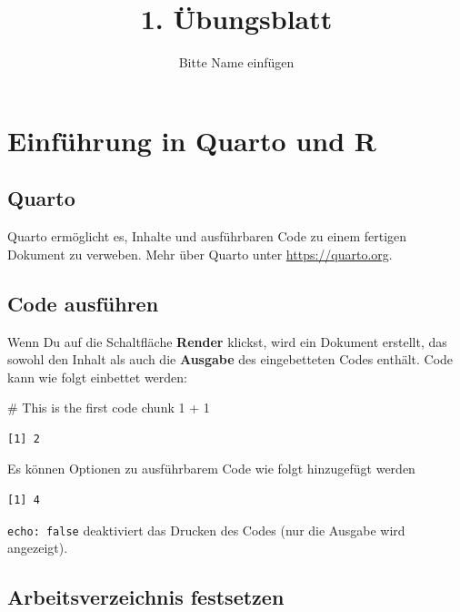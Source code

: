 \documentclass[
  letterpaper,
  DIV=11,
  numbers=noendperiod]{scrartcl}
\title{1. Übungsblatt}
\author{Bitte Name einfügen}
\date{}
\newenvironment{Shaded}{\begin{snugshade}}{\end{snugshade}}
\newcommand{\CommentTok}[1]{\textcolor[rgb]{0.37,0.37,0.37}{#1}}
\newcommand{\DecValTok}[1]{\textcolor[rgb]{0.68,0.00,0.00}{#1}}
\newcommand{\SpecialCharTok}[1]{\textcolor[rgb]{0.37,0.37,0.37}{#1}}
\begin{document}
\maketitle


\section{Einführung in Quarto und
R}\label{einfuxfchrung-in-quarto-und-r}

\subsection{Quarto}\label{quarto}

Quarto ermöglicht es, Inhalte und ausführbaren Code zu einem fertigen
Dokument zu verweben. Mehr über Quarto unter \url{https://quarto.org}.

\subsection{Code ausführen}\label{code-ausfuxfchren}

Wenn Du auf die Schaltfläche \textbf{Render} klickst, wird ein Dokument
erstellt, das sowohl den Inhalt als auch die \textbf{Ausgabe} des
eingebetteten Codes enthält. Code kann wie folgt einbettet werden:

\begin{Shaded}
\begin{Highlighting}[]
\CommentTok{\# This is the first code chunk}
\DecValTok{1} \SpecialCharTok{+} \DecValTok{1}
\end{Highlighting}
\end{Shaded}

\begin{verbatim}
[1] 2
\end{verbatim}

Es können Optionen zu ausführbarem Code wie folgt hinzugefügt werden

\begin{verbatim}
[1] 4
\end{verbatim}

\texttt{echo:\ false} deaktiviert das Drucken des Codes (nur die Ausgabe
wird angezeigt).

\subsection{Arbeitsverzeichnis
festsetzen}\label{arbeitsverzeichnis-festsetzen}
\end{document}
